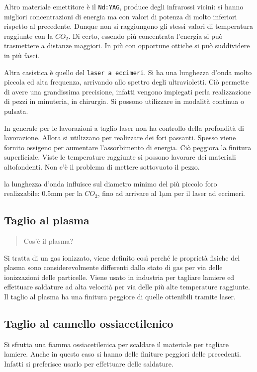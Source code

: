 Altro materiale emettitore è il \texttt{Nd:YAG}, produce degli infrarossi vicini: si hanno migliori concentrazioni di energia ma con valori di potenza di molto inferiori rispetto al precedente. Dunque non si raggiungono gli stessi valori di temperatura raggiunte con la $CO_2$.
Di certo, essendo più concentrata l'energia si può trasmettere a distanze maggiori. In più con opportune ottiche si può suddividere in più fasci.

Altra casistica è quello del \texttt{laser a eccimeri}. Si ha una lunghezza d'onda molto piccola ed alta frequenza, arrivando allo spettro degli ultravioletti. 
Ciò permette di avere una grandissima precisione, infatti vengono impiegati perla realizzazione di pezzi in minuteria, in chirurgia.
Si possono utilizzare in modalità continua o pulsata.

In generale per le lavorazioni a taglio laser non ha controllo della profondità di lavorazione. Allora si utilizzano per realizzare dei fori passanti.
Spesso viene fornito ossigeno per aumentare l'assorbimento di energia.
Ciò peggiora la finitura superficiale. 
Viste le temperature raggiunte si possono lavorare dei materiali altofondenti. Non c'è il problema di mettere sottovuoto il pezzo.

la lunghezza d'onda influisce sul diametro minimo del più piccolo foro realizzabile:
$0.5\unit{\mm}$ per la $CO_2$, fino ad arrivare al $1\unit{\um}$ per il laser ad eccimeri.

\subsection{Taglio al plasma}
\begin{quote}
Cos'è il plasma?
\end{quote}
Si tratta di un gas ionizzato, viene definito così perché le proprietà fisiche del plasma sono considerevolmente differenti dallo stato di gas per via delle ionizzazioni delle particelle.
Viene usato in industria per tagliare lamiere ed effettuare saldature ad alta velocità per via delle più alte temperature raggiunte.
Il taglio al plasma ha una finitura peggiore di quelle ottenibili tramite laser.

\subsection{Taglio al cannello ossiacetilenico}
Si sfrutta una fiamma ossiacetilenica per scaldare il materiale per tagliare lamiere. Anche in questo caso si hanno delle finiture peggiori delle precedenti. Infatti si preferisce usarlo per effettuare delle saldature.


